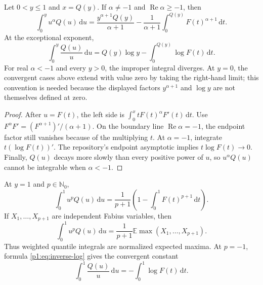 \documentclass[11pt,oneside]{article}
\theoremstyle{definition}
\theoremstyle{remark}
\newcommand{\E}{\mathbb E}
\newcommand{\N}{\mathbb N}
\newcommand{\dd}{\,\mathrm d}
\newcommand{\1}{\mathbf 1}
\DeclareMathOperator{\Rea}{Re}
\begin{document}
\begin{proposition}\label{p1:prop:inverse-weighted}
Let \(0<y\leq1\) and \(x=Q(y)\).  If \(\alpha\neq-1\) and
\(\Rea\alpha\geq-1\), then
\begin{equation}
 \boxed{\quad
 \int_0^yu^\alpha Q(u)\dd u
 =\frac{y^{\alpha+1}Q(y)}{\alpha+1}
 -\frac1{\alpha+1}\int_0^{Q(y)}F(t)^{\alpha+1}\dd t.
 \quad}                                                        \label{p1:eq:inverse-weighted}
\end{equation}
At the exceptional exponent,
\begin{equation}
 \boxed{\quad
 \int_0^y\frac{Q(u)}u\dd u
 =Q(y)\log y-\int_0^{Q(y)}\log F(t)\dd t.
 \quad}                                                        \label{p1:eq:inverse-log}
\end{equation}
For real \(\alpha<-1\) and every \(y>0\), the improper integral diverges.
At \(y=0\), the convergent cases above extend with value zero by taking the
right-hand limit; this convention is needed because the displayed factors
\(y^{\alpha+1}\) and \(\log y\) are not themselves defined at zero.
\end{proposition}

\begin{proof}
After \(u=F(t)\), the left side is
\(\int_0^xtF(t)^\alpha F'(t)\dd t\).  Use
\(F^\alpha F'=(F^{\alpha+1})'/(\alpha+1)\).  On the boundary line
\(\Rea\alpha=-1\), the endpoint factor still vanishes because of the
multiplying \(t\).  At \(\alpha=-1\), integrate
\(t(\log F(t))'\).  The repository's endpoint asymptotic implies
\(t\log F(t)\to0\).  Finally, \(Q(u)\) decays more slowly than every positive
power of \(u\), so \(u^\alpha Q(u)\) cannot be integrable when
\(\alpha<-1\).
\end{proof}

At \(y=1\) and \(p\in\N_0\),
\begin{equation}
 \boxed{\quad
 \int_0^1u^pQ(u)\dd u
 =\frac1{p+1}\left(1-\int_0^1F(t)^{p+1}\dd t\right).
 \quad}                                                        \label{p1:eq:inverse-definite-p}
\end{equation}
If \(X_1,\ldots,X_{p+1}\) are independent Fabius variables, then
\begin{equation}
 \int_0^1u^pQ(u)\dd u
 =\frac1{p+1}\E\max(X_1,\ldots,X_{p+1}).                       \label{p1:eq:inverse-order-stat}
\end{equation}
Thus weighted quantile integrals are normalized expected maxima.
At \(p=-1\), formula \eqref{p1:eq:inverse-log} gives the convergent constant
\begin{equation}
 \int_0^1\frac{Q(u)}u\dd u=-\int_0^1\log F(t)\dd t.            \label{p1:eq:inverse-log-constant}
\end{equation}
\end{document}
